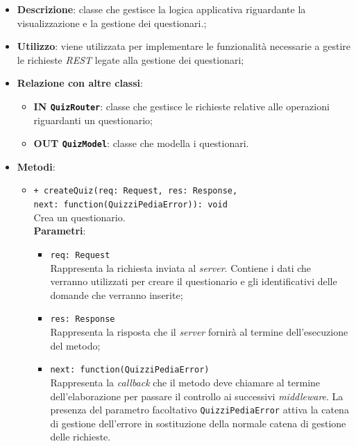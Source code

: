 \begin{itemize}
	\item \textbf{Descrizione}:
	classe che gestisce la logica applicativa riguardante la visualizzazione e la gestione dei questionari.;
	\item \textbf{Utilizzo}:
	viene utilizzata per implementare le funzionalità necessarie a gestire le richieste \textit{REST} legate alla gestione dei questionari;
	\item \textbf{Relazione con altre classi}:
	\begin{itemize}
			\item \textbf{IN \texttt{QuizRouter}}:
			classe che gestisce le richieste relative alle operazioni riguardanti un questionario;
			\item \textbf{OUT \texttt{QuizModel}}:
			classe che modella i questionari.
	\end{itemize}
	\item \textbf{Metodi}:
	\begin{itemize}
		\item \texttt{+ createQuiz(req: Request, res: Response, \\next: function(QuizziPediaError)): void}\\
		Crea un questionario.\\
		\textbf{Parametri}:
		\begin{itemize}
			\item \texttt{req: Request}\\
			Rappresenta la richiesta inviata al \textit{server}. Contiene i dati che verranno utilizzati per creare il questionario e gli identificativi delle domande che verranno inserite;
			\item \texttt{res: Response}\\
			Rappresenta la risposta che il \textit{server} fornirà al termine dell'esecuzione del metodo;
			\item \texttt{next: function(QuizziPediaError)}\\
			Rappresenta la \textit{callback} che il metodo deve chiamare al termine dell'elaborazione per passare il controllo ai successivi \textit{middleware}. La presenza del parametro facoltativo \texttt{QuizziPediaError} attiva la catena di gestione dell'errore in sostituzione della normale catena di gestione delle richieste.
		\end{itemize}
	

\end{itemize}
\end{itemize}
